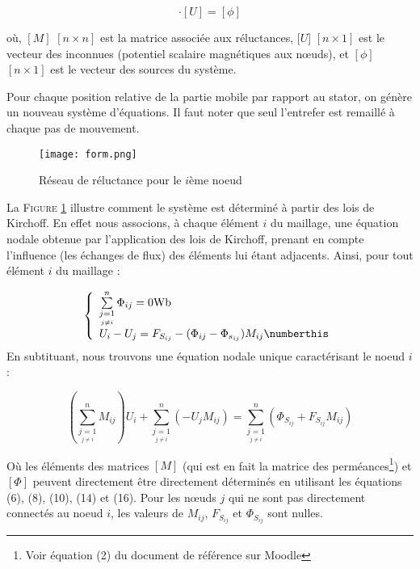\begin{equation}
    [M]\cdot[U]=[\phi]
\end{equation}

où, $[M]$ $[n \times n]$ est la matrice associée aux réluctances, $[U$] $[n \times 1]$ est le vecteur des
inconnues (potentiel scalaire magnétiques aux nœuds), et $[\phi]$ $[n \times 1]$ est le vecteur des
sources du système.

Pour chaque position relative de la partie mobile par rapport au stator, on génère un nouveau système
d’équations. Il faut noter que seul l’entrefer est remaillé à chaque pas de
mouvement.

\begin{figure}[H]
    \centering
    \texttt{[image: form.png]}
    \caption{Réseau de réluctance pour le $i$ème noeud}
    \label{kirc}
\end{figure}

La \textsc{Figure \ref{kirc}} illustre comment le système est déterminé à partir des lois de Kirchoff. En effet nous associons, à chaque élément $i$ du maillage, une équation nodale obtenue par l'application des lois de Kirchoff, prenant en compte l'influence (les échanges de flux) des éléments lui étant adjacents. Ainsi, pour tout élément $i$ du maillage : 


\[
\left\{
\begin{array}{l c l}
\sum \limits_{\underset{j \neq i}{j=1}}^n \Phi_{ij} = 0 \text{Wb}\\
U_i-U_j = F_{S_{ij}}-(\Phi_{ij}-\Phi_{s_{ij}})M_{ij}\numberthis
\end{array}
\right.
\]
\newpage
En subtituant, nous trouvons une équation nodale unique caractérisant le noeud $i$ : 

\begin{equation}
    \left(\sum \limits_{\underset{j \neq i}{j=1}}^n M_{ij}\right)U_i+\sum \limits_{\underset{j \neq i}{j=1}}^n \left(-U_jM_{ij}\right)=\sum \limits_{\underset{j \neq i}{j=1}}^n \left(\Phi_{S_{ij}}+F_{S_{ij}}M_{ij}\right)
\end{equation}

Où les éléments des matrices $[M]$ (qui est en fait la matrice des perméances\footnote{Voir équation (2) du document de référence sur Moodle}) et $[\Phi]$ peuvent directement être directement déterminés en utilisant les équations (6), (8), (10), (14) et (16). Pour les nœuds $j$ qui ne sont pas directement connectés au noeud $i$, les
valeurs de $M_{ij}$, $F_{S_{ij}}$ et $\Phi_{S_{ij}}$ sont nulles.

